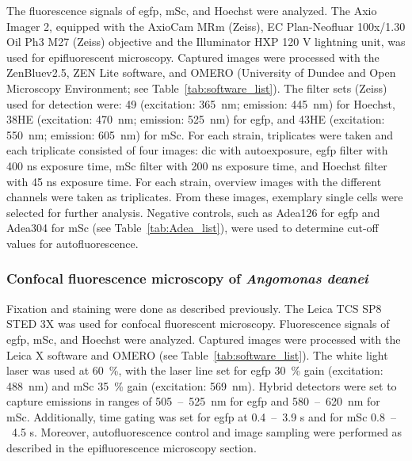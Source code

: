 \par The fluorescence signals of \gls{egfp}, \gls{mSc}, and Hoechst were analyzed. The Axio Imager 2, equipped with the AxioCam MRm (Zeiss), EC Plan-Neofluar 100x/1.30 Oil Ph3 M27 (Zeiss) objective and the Illuminator HXP 120 V lightning unit, was used for epifluorescent microscopy. Captured images were processed with the ZenBluev2.5, ZEN Lite software, and OMERO (University of Dundee and Open Microscopy Environment; see Table~\ref{tab:software_list}). The filter sets (Zeiss) used for detection were: 49 (excitation: 365~nm; emission: 445~nm) for Hoechst, 38HE (excitation: 470~nm; emission: 525~nm) for \gls{egfp}, and 43HE (excitation: 550~nm; emission: 605~nm) for \gls{mSc}. For each strain, triplicates were taken and each triplicate consisted of four images: \gls{dic} with autoexposure, \gls{egfp} filter with 400 ns exposure time, \gls{mSc} filter with 200 ns exposure time, and Hoechst filter with 45 ns exposure time. For each strain, overview images with the different channels were taken as triplicates. From these images, exemplary single cells were selected for further analysis. Negative controls, such as Adea126 for \gls{egfp} and Adea304 for \gls{mSc} (see Table~\ref{tab:Adea_list}), were used to determine cut-off values for autofluorescence.   
\subsubsection{Confocal fluorescence microscopy of \textit{Angomonas deanei}} \label{txt:confo_micro}
Fixation and staining were done as described previously. The Leica TCS SP8 STED 3X was used for confocal fluorescent microscopy. Fluorescence signals of \gls{egfp}, \gls{mSc}, and Hoechst were analyzed. Captured images were processed with the Leica X software and OMERO (see Table~\ref{tab:software_list}). The white light laser was used at 60~\%, with the laser line set for \gls{egfp} 30~\% gain (excitation: 488~nm) and \gls{mSc} 35~\% gain (excitation: 569~nm). Hybrid detectors were set to capture emissions in ranges of 505~--~525~nm for \gls{egfp} and 580~--~620~nm for \gls{mSc}. Additionally, time gating was set for \gls{egfp} at 0.4~--~3.9 s and for \gls{mSc} 0.8~--~4.5 s. Moreover, autofluorescence control and image sampling were performed as described in the epifluorescence microscopy section.
